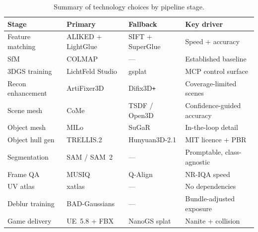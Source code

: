 \begin{table}[h]
\centering
\caption{Summary of technology choices by pipeline stage.}
\label{tab:tech_summary}
\begin{tabular}{llll}
\toprule
\textbf{Stage} & \textbf{Primary} & \textbf{Fallback} & \textbf{Key driver} \\
\midrule
Feature matching   & ALIKED + LightGlue \cite{zhao2023_aliked,lindenberger2023_lightglue}   & SIFT + SuperGlue         & Speed + accuracy \\
SfM                & COLMAP \cite{schoenberger2016sfm}                                        & ---                      & Established baseline \\
3DGS training      & LichtFeld Studio \cite{lichtfeld2026}                                    & gsplat                   & MCP control surface \\
Recon enhancement  & ArtiFixer3D \cite{delutio2026_artifixer}                                 & Difix3D\texttt{+}        & Coverage-limited scenes \\
Scene mesh         & CoMe \cite{radl2026_come}                                                & TSDF / Open3D \cite{zhou2018_open3d}  & Confidence-guided accuracy \\
Object mesh        & MILo \cite{guedon2025_milo}                                              & SuGaR \cite{guedon2024_sugar}         & In-the-loop detail \\
Object hull gen    & TRELLIS.2 \cite{xiang2025_trellis2}                                      & Hunyuan3D-2.1 \cite{hunyuan2025_21}   & MIT licence + PBR \\
Segmentation       & SAM / SAM~2 \cite{kirillov2023_sam,ravi2024_sam2}                        & ---                      & Promptable, class-agnostic \\
Frame QA           & MUSIQ \cite{ke2021_musiq}                                                 & Q-Align \cite{wang2023_qalign}        & NR-IQA speed \\
UV atlas           & xatlas \cite{xatlas2018}                                                 & ---                      & No dependencies \\
Deblur training    & BAD-Gaussians \cite{zhao2024_badgaussians}                               & ---                      & Bundle-adjusted exposure \\
Game delivery      & UE~5.8 + FBX \cite{epicgames2024_ue5}                                    & NanoGS splat \cite{nanogs2026}        & Nanite + collision \\
\bottomrule
\end{tabular}
\end{table}
